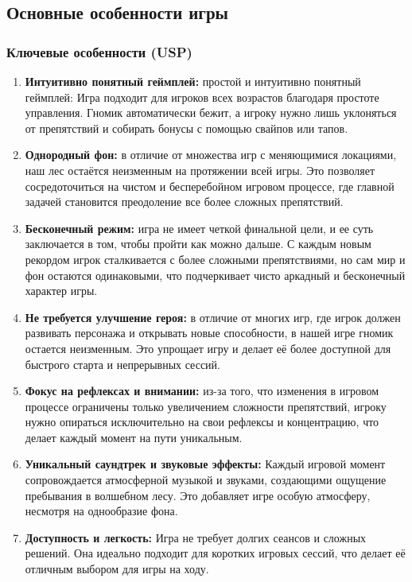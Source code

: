 \documentclass{article}
\begin{document}
\subsection{Основные особенности игры}

\subsubsection{Ключевые особенности (USP)}
\begin{enumerate}
    \item \textbf{Интуитивно понятный геймплей:} простой и интуитивно понятный геймплей: Игра подходит для игроков всех возрастов благодаря простоте управления. Гномик автоматически бежит, а игроку нужно лишь уклоняться от препятствий и собирать бонусы с помощью свайпов или тапов.
    \item \textbf{Однородный фон:} в отличие от множества игр с меняющимися локациями, наш лес остаётся неизменным на протяжении всей игры. Это позволяет сосредоточиться на чистом и бесперебойном игровом процессе, где главной задачей становится преодоление все более сложных препятствий.
    \item \textbf{Бесконечный режим:} игра не имеет четкой финальной цели, и ее суть заключается в том, чтобы пройти как можно дальше. С каждым новым рекордом игрок сталкивается с более сложными препятствиями, но сам мир и фон остаются одинаковыми, что подчеркивает чисто аркадный и бесконечный характер игры.
    \item \textbf{Не требуется улучшение героя:} в отличие от многих игр, где игрок должен развивать персонажа и открывать новые способности, в нашей игре гномик остается неизменным. Это упрощает игру и делает её более доступной для быстрого старта и непрерывных сессий.
    \item \textbf{Фокус на рефлексах и внимании:} из-за того, что изменения в игровом процессе ограничены только увеличением сложности препятствий, игроку нужно опираться исключительно на свои рефлексы и концентрацию, что делает каждый момент на пути уникальным.
    \item \textbf{Уникальный саундтрек и звуковые эффекты:} Каждый игровой момент сопровождается атмосферной музыкой и звуками, создающими ощущение пребывания в волшебном лесу. Это добавляет игре особую атмосферу, несмотря на однообразие фона.
    \item \textbf{Доступность и легкость:} Игра не требует долгих сеансов и сложных решений. Она идеально подходит для коротких игровых сессий, что делает её отличным выбором для игры на ходу.
\end{enumerate}
\end{document}
